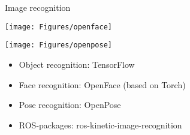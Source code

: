\documentclass[12pt,a4paper]{article}
\newcommand{\emptylogo}{\texttt{[image: Figures/Empty]}}
\begin{document}
\begin{slidetop}
\begin{multicols}{2}
\begin{bclogo}[couleur = white, arrondi = 0.25, couleurBord = tuedarkblue , barre = none, logo=\emptylogo]{\textcolor{tuedarkblue}{Image recognition}}
\medskip %
\begin{minipage}[T]{0.48\linewidth}
	\begin{center}
		\texttt{[image: Figures/openface]}
	\end{center}
\end{minipage}
\hfill
\begin{minipage}[T]{0.48\linewidth}
    \begin{center}
        \texttt{[image: Figures/openpose]}
    \end{center}
\end{minipage}
\begin{itemize}[topsep=0pt, itemsep = 0pt, parsep = 0pt, leftmargin=15pt]
	\item Object recognition: TensorFlow
	\item Face recognition: OpenFace (based on Torch)
    \item Pose recognition: OpenPose
    \item ROS-packages: ros-kinetic-image-recognition
\end{itemize}
\end{bclogo}

\vfill
\columnbreak


\end{multicols}
\end{slidetop}
\end{document}
